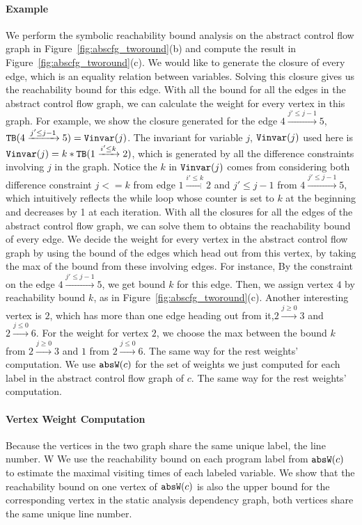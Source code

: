 \begin{enumerate}
\paragraph*{Example}
We perform the symbolic reachability bound analysis on the abstract control flow graph in Figure~\ref{fig:abscfg_tworound}(b) and compute the result in Figure~\ref{fig:abscfg_tworound}(c).
We would like to generate the closure of every edge, which is an equality relation between variables.  Solving this closure gives us the reachability bound for this edge. With all the bound for all the edges in the abstract control flow graph, we can calculate the weight for every vertex in this graph. For example, we show the closure generated for the edge 
$4 \xrightarrow{j' \leq j - 1} 5$, 
${\mathtt{TB}}(4 \xrightarrow{j' \leq j - 1} 5) = {\mathtt{Vinvar}}(j)$. The invariant for variable $j$, ${\mathtt{Vinvar}}(j)$ used here is 
${\mathtt{Vinvar}}(j) = k * {\mathtt{TB}}(1 \xrightarrow{i' \leq k} 2)$, which is generated by all the difference constraints involving $j$ in the graph. Notice the $k$ in ${\mathtt{Vinvar}}(j)$ comes from considering both difference constraint $j<=k$ from edge $1 \xrightarrow{i' \leq k} 2$ and $j'\leq j - 1$ from $4 \xrightarrow{j' \leq j - 1} 5$, which intuitively reflects the while loop whose counter is set to $k$ at the beginning and decreases by 1 at each iteration. 
With all the closures for all the edges of the abstract control flow graph, we can solve them to obtains the reachability bound of every edge. We decide the weight for every vertex in the abstract control flow graph by using the bound of the edges which head out from this vertex, by taking the max of the bound from these involving edges. For instance,   
By the constraint on the edge $4 \xrightarrow{j' \leq j - 1} 5$, we get bound $k$ for this edge.
Then, we assign vertex $4$ by reachability bound $k$, as in Figure~\ref{fig:abscfg_tworound}(c). 
Another interesting vertex is $2$, which has more than one edge heading out from it,$2 \xrightarrow{j \geq 0} 3$ and 
$2 \xrightarrow{j \leq 0} 6$. For the weight for vertex $2$, we choose the max between the bound $k$ from $2 \xrightarrow{j \geq 0} 3$ and $1$ from $2 \xrightarrow{j \leq 0} 6$.
The same way for the rest weights' computation.
We use $\mathtt{abs}{\mathtt{W}}(c)$ for the set of weights we just computed 
for each label in the abstract control flow graph of $c$.
%
The same way for the rest weights' computation.
\end{enumerate}

\paragraph{Vertex Weight Computation}
Because
the vertices in the two graph share the same unique label, the line number. W
We use the reachability bound on each program label from $\mathtt{abs}{\mathtt{W}}(c)$ to estimate the maximal visiting times of each labeled variable.
We show that the reachability bound on one vertex of $\mathtt{abs}{\mathtt{W}}(c)$ is also the upper bound for the corresponding vertex in the static analysis dependency graph, both vertices share the same unique line number.

